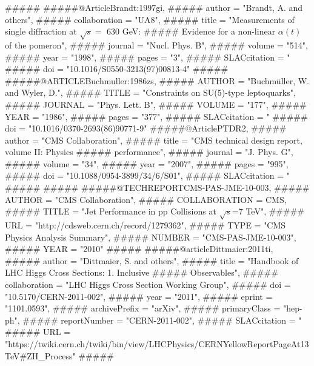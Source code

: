 #####%
#####@Article{Brandt:1997gi,
#####     author    = "Brandt, A. and others",
##### collaboration = "UA8",
#####     title     = "Measurements of single diffraction at $\sqrt{s} =$ 630 {GeV}:
#####                  Evidence for  a non-linear $\alpha(t)$ of the pomeron",
#####     journal   = "Nucl. Phys. B",
#####     volume    = "514",
#####     year      = "1998",
#####     pages     = "3",
#####     SLACcitation  = "%
#####     doi       = "10.1016/S0550-3213(97)00813-4"
#####}
#####@ARTICLE{Buchmuller:1986zs,
#####     AUTHOR       = "Buchm{\"u}ller, W. and Wyler, D.",
#####     TITLE        = "Constraints on {SU(5)}-type leptoquarks",
#####     JOURNAL      = "Phys. Lett. B",
#####     VOLUME       = "177",
#####     YEAR         = "1986",
#####     pages        = "377",
#####     SLACcitation  = "%
#####     doi          = "10.1016/0370-2693(86)90771-9"}
#####@Article{PTDR2,
#####     author    = "{CMS Collaboration}",
#####     title     = "{CMS} technical design report, volume {II}: {Physics}
#####                  performance",
#####     journal   = "J. Phys. G",
#####     volume    = "34",
#####     year      = "2007",
#####     pages     = "995",
#####     doi       = "10.1088/0954-3899/34/6/S01",
#####     SLACcitation  = "%
#####}
#####%
#####@TECHREPORT{CMS-PAS-JME-10-003,
#####      AUTHOR      = "{CMS Collaboration}",
#####      COLLABORATION = {CMS},
#####      TITLE       = "Jet Performance in pp Collisions at $\sqrt{s}$=7 {TeV}",
#####      URL         = "http://cdsweb.cern.ch/record/1279362",
#####      TYPE     = "CMS Physics Analysis Summary",
#####      NUMBER      = "CMS-PAS-JME-10-003",
#####      YEAR        = "2010"
#####}
#####@article{Dittmaier:2011ti,
#####      author         = "Dittmaier, S. and others",
#####      title          = "{Handbook of LHC Higgs Cross Sections: 1. Inclusive
#####                        Observables}",
#####      collaboration  = "LHC Higgs Cross Section Working Group",
#####      doi            = "10.5170/CERN-2011-002",
#####      year           = "2011",
#####      eprint         = "1101.0593",
#####      archivePrefix  = "arXiv",
#####      primaryClass   = "hep-ph",
#####      reportNumber   = "CERN-2011-002",
#####      SLACcitation   = "%
#####      URL = "https://twiki.cern.ch/twiki/bin/view/LHCPhysics/CERNYellowReportPageAt13TeV#ZH_Process"
#####}
